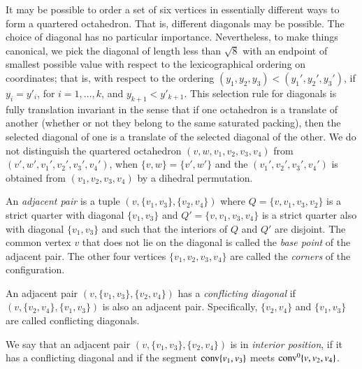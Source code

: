 \begin{remark}\label{def:oct-order}
It may be possible to order a set of six vertices in essentially
different ways to form a quartered octahedron.  That is, different
diagonals may be possible.    The choice of diagonal has no
particular importance.
%
Nevertheless, to make things canonical, we
pick the diagonal of length less than $\sqrt8$ with an endpoint of
smallest possible value with respect to the lexicographical
ordering on coordinates; that is, with respect to the ordering
$(y_1,y_2,y_3) < (y_1',y_2',y_3')$, if $y_i=y'_i$, for
$i=1,\ldots,k$, and $y_{k+1}<y'_{k+1}$.  This selection rule for
diagonals is fully translation invariant in the sense that if one
octahedron is a translate of another (whether or not they belong
to the same saturated packing), then the selected diagonal of one
is a translate of the selected diagonal of the other.
%
We do not distinguish the quartered octahedron
$(v,w,v_1,v_2,v_3,v_4)$ from $(v',w',v_1',v_2',v_3',v_4')$, when
$\{v,w\} = \{v',w'\}$ and the $(v_1',v_2',v_3',v_4')$ is obtained
from $(v_1,v_2,v_3,v_4)$ by a dihedral permutation.
\end{remark}




\begin{definition}\label{def:adj-pair}\label{def:corner}
An {\it adjacent pair} is a tuple
$(v,\{v_1,v_3\},\{v_2,v_4\})$ where $Q=\{v,v_1,v_3,v_2\}$ is a
strict quarter with diagonal $\{v_1,v_3\}$ and
$Q'=\{v,v_1,v_3,v_4\}$ is a strict quarter also with diagonal
$\{v_1,v_3\}$ and such that the interiors of $Q$ and $Q'$ are
disjoint.  The common vertex $v$ that does not lie on the diagonal
is called the {\it base point\/} of the adjacent pair.   The other
four vertices $\{v_1,v_2,v_3,v_4\}$ are called the {\it corners\/}
of the configuration.
%
\end{definition}


\begin{definition}\label{def:conflicting-diag} An adjacent pair
$(v,\{v_1,v_3\},\{v_2,v_4\})$ has a {\it conflicting
diagonal} if
$(v,\{v_2,v_4\},\{v_1,v_3\})$ is also an adjacent pair.
Specifically, $\{v_2,v_4\}$ and $\{v_1,v_3\}$ are called
conflicting diagonals.
\end{definition}

\begin{definition}\label{def:interior-position}  We say
that an adjacent pair $(v,\{v_1,v_3\},\{v_2,v_4\})$ is in {\it
interior position}, if it has a conflicting diagonal and if the
segment ${\operatorname{conv}}\{v_1,v_3\}$ meets
${\operatorname{conv}}^0\{v,v_2,v_4\}$. 
\end{definition}

